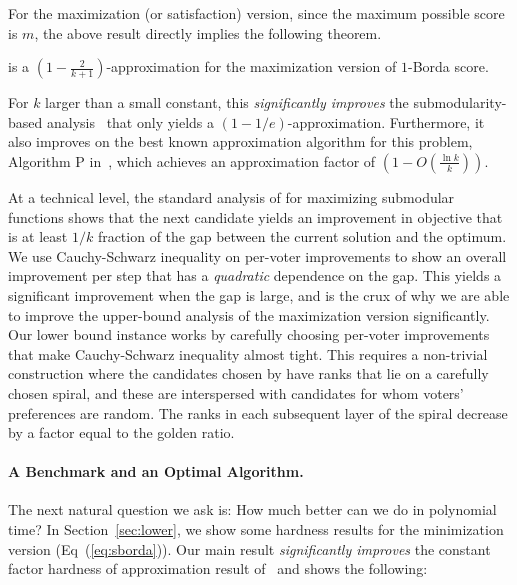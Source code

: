 For the maximization (or satisfaction) version, since the maximum possible score is $m$, the above result directly implies the following theorem.
\begin{theorem}
\label{thm:greedymax}
\g{} is a $\left(1 - \frac{2}{k+1}\right)$-approximation for the maximization version of $1$-Borda score.
\end{theorem} 
For $k$ larger than a small constant, this {\em significantly improves} the submodularity-based analysis~\cite{LuB} that only yields a $(1-1/e)$-approximation. Furthermore, it also improves on the best known approximation algorithm for this problem, Algorithm P in~\cite{SkworonFS15}, which achieves an approximation factor of $\left(1 - O\left(\frac{\ln k}{k}\right)\right)$.

At a technical level, the standard analysis of \g{} for maximizing submodular functions shows that the next candidate yields an improvement in objective that is at least $1/k$ fraction of the gap between the current solution and the optimum. We use Cauchy-Schwarz inequality on per-voter improvements to show an overall improvement per step that has a {\em quadratic} dependence on the gap. This yields a significant improvement when the gap is large, and is the crux of why we are able to improve the upper-bound analysis of the maximization version significantly. Our lower bound instance works by carefully choosing per-voter improvements that make Cauchy-Schwarz inequality almost tight. This requires a non-trivial construction where the candidates chosen by \g{} have ranks that lie on a carefully chosen spiral, and these are interspersed with candidates for whom voters' preferences are random. The ranks in each subsequent layer of the spiral decrease by a factor equal to the golden ratio.

\paragraph{A Benchmark and an Optimal Algorithm.} The next natural question we ask is: How much better can we do in polynomial time? In Section~\ref{sec:lower}, we show some hardness results for the minimization version (Eq~(\ref{eq:sborda})). %
Our main result {\em significantly improves} the constant factor hardness of approximation result of~\cite{SkworonFS15} and shows the following: 

